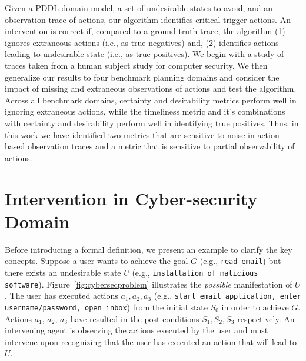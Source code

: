 Given a PDDL domain model, a set of undesirable states to avoid, and an observation trace of actions, our algorithm identifies critical trigger actions. An intervention is correct if, compared to a ground truth trace, the algorithm (1) ignores extraneous actions (i.e., as true-negatives) and, (2)
identifies actions leading to undesirable state (i.e., as true-positives). We begin with a study of traces taken from a human subject study for computer security. We then generalize our results to four benchmark planning domains and
consider the impact of missing and extraneous observations of actions and test the algorithm. Across all benchmark domains, certainty and desirability metrics perform well in ignoring extraneous actions, while the timeliness metric and
it's combinations with certainty and desirability perform well in identifying true positives. Thus, in this work we have identified two metrics that are sensitive to noise in action based observation traces and a metric that is sensitive to partial observability of actions.



\section{Intervention in Cyber-security Domain}
Before introducing a formal definition, we present an example to clarify the key concepts. 
Suppose a user wants to  achieve the goal $G$ (e.g., \texttt{read email}) but there exists an undesirable state $U$ (e.g., \texttt{installation of malicious software}). 
Figure~\ref{fig:cybersecproblem} illustrates the \emph{possible} manifestation of $U$. 
The user has executed actions $a_1, a_2, a_3$ (e.g., \texttt{start email application, enter username/password, open inbox}) from the initial state $S_0$ in order to achieve  $G$.
Actions $a_1$, $a_2$, $a_3$ have resulted in the post conditions $S_{1}, S_{2}, S_3$ respectively. 
An intervening agent is observing the actions executed by the user and must intervene upon recognizing that the user has executed an action that will lead to $U$.

